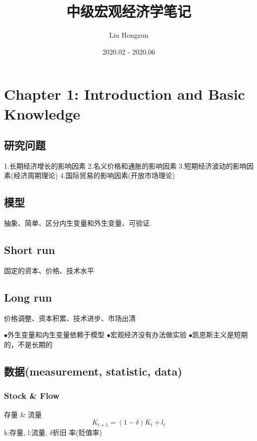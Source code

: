 \documentclass[UTF8, onecolumn, a4paper, 12pt]{article}
\title{中级宏观经济学笔记}%
\author{Liu Hongzun}
\affil{Department of Computer Science, Tsinghua University}
\date{2020.02 - 2020.06}
\begin{document}
\setlength\columnseprule{0.2pt}
\section{Chapter 1: Introduction and Basic Knowledge}
\subsection{研究问题}
1.长期经济增长的影响因素
2.名义价格和通胀的影响因素
3.短期经济波动的影响因素(经济周期理论)
4.国际贸易的影响因素(开放市场理论)
\subsection{模型}
抽象、简单、区分内生变量和外生变量、可验证.
\subsection{Short run}
固定的资本、价格、技术水平
\subsection{Long run}
价格调整、资本积累、技术进步、市场出清

$\bullet$外生变量和内生变量依赖于模型
$\bullet$宏观经济没有办法做实验
$\bullet$凯恩斯主义是短期的，不是长期的
\subsection{数据(measurement, statistic, data)}
\subsubsection{Stock \& Flow}
存量 \& 流量\\
$$K_{t+1} = (1 - \delta)K_t + l_t$$
k:存量, l:流量, $\delta$折旧 率(贬值率)
\end{document}

